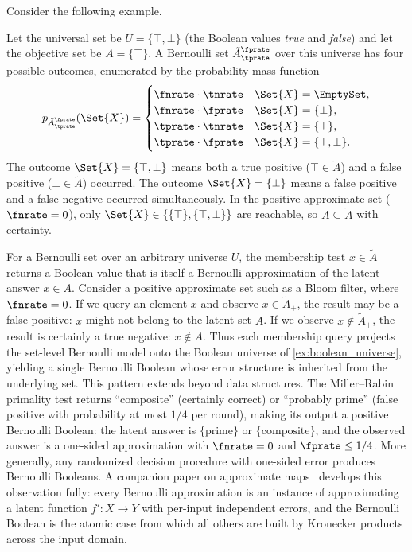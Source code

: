 Consider the following example.
\begin{example}
\label{ex:boolean_universe}
	Let the universal set be $U = \{\top, \bot\}$ (the Boolean values \emph{true} and \emph{false}) and let the objective set be $A = \{\top\}$.
	A Bernoulli set $\tilde{A}^\fprate_\tprate$ over this universe has four possible outcomes, enumerated by the probability mass function
	\begin{equation}
	p_{\tilde{A}^\fprate_\tprate}(\Set{X}) =
	\begin{cases}
	\fnrate \cdot \tnrate & \Set{X} = \EmptySet,\\
	\fnrate \cdot \fprate & \Set{X} = \{\bot\},\\
	\tprate \cdot \tnrate & \Set{X} = \{\top\},\\
	\tprate \cdot \fprate & \Set{X} = \{\top, \bot\}.
	\end{cases}
	\end{equation}
	The outcome $\Set{X} = \{\top, \bot\}$ means both a true positive ($\top \in \tilde{A}$) and a false positive ($\bot \in \tilde{A}$) occurred.
	The outcome $\Set{X} = \{\bot\}$ means a false positive and a false negative occurred simultaneously.
	In the positive approximate set ($\fnrate = 0$), only $\Set{X} \in \{\{\top\}, \{\top, \bot\}\}$ are reachable, so $A \subseteq \tilde{A}$ with certainty.
\end{example}

\begin{remark}
\label{rem:membership_boolean}
For a Bernoulli set over an arbitrary universe $U$, the membership test $x \in \tilde{A}$ returns a Boolean value that is itself a Bernoulli approximation of the latent answer $x \in A$.
Consider a positive approximate set such as a Bloom filter, where $\fnrate = 0$.
If we query an element $x$ and observe $x \in \tilde{A}_+$, the result may be a false positive: $x$ might not belong to the latent set $A$.
If we observe $x \notin \tilde{A}_+$, the result is certainly a true negative: $x \notin A$.
Thus each membership query projects the set-level Bernoulli model onto the Boolean universe of \cref{ex:boolean_universe}, yielding a single Bernoulli Boolean whose error structure is inherited from the underlying set.
This pattern extends beyond data structures.
The Miller--Rabin primality test returns ``composite'' (certainly correct) or ``probably prime'' (false positive with probability at most $1/4$ per round), making its output a positive Bernoulli Boolean: the latent answer is $\{\text{prime}\}$ or $\{\text{composite}\}$, and the observed answer is a one-sided approximation with $\fnrate = 0$ and $\fprate \leq 1/4$.
More generally, any randomized decision procedure with one-sided error produces Bernoulli Booleans.
A companion paper on approximate maps~\cite{bernoulliMaps} develops this observation fully: every Bernoulli approximation is an instance of approximating a latent function $f' \colon X \to Y$ with per-input independent errors, and the Bernoulli Boolean is the atomic case from which all others are built by Kronecker products across the input domain.
\end{remark}

